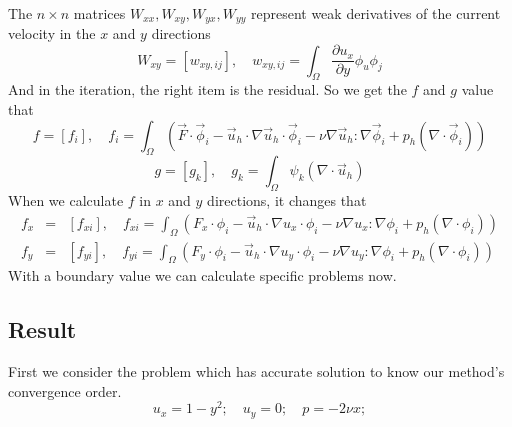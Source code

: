 \documentclass[a4paper]{article}
\begin{document}
The $n\times n$ matrices $W_{xx}, W_{xy}, W_{yx}, W_{yy}$ represent weak derivatives of the current velocity in the $x$ and $y$ directions
\begin{equation}
W_{xy} = [w_{xy,ij}],\quad w_{xy,ij} = \int_{\Omega} \frac{\partial u_x}{\partial y}\phi_u \phi_j
\label{mt::W}
\end{equation}
And in the iteration, the right item is the residual. So we get the $f$ and $g$ value that
\begin{equation}
f = [f_i],\quad f_i=\int_{\Omega}(\vec{F}\cdot\vec{\phi}_i-\vec{u}_h\cdot\nabla\vec{u}_h\cdot\vec{\phi}_i-\nu\nabla\vec{u}_h:\nabla\vec{\phi}_i+p_h(\nabla\cdot\vec{\phi}_i))
\end{equation}
\begin{equation}
g = [g_k],\quad g_k=\int_{\Omega}\psi_k(\nabla \cdot \vec{u}_h)
\end{equation}
When we calculate $f$ in $x$ and $y$ directions, it changes that
\begin{equation}
\begin{array}{rcl}
f_x &=& [f_{xi}],\quad f_{xi}=\int_{\Omega}(F_x\cdot\phi_i-\vec{u}_h\cdot\nabla u_x\cdot\phi_i-\nu\nabla u_x:\nabla\phi_i+p_h(\nabla\cdot\phi_i)) \\
f_y &=& [f_{yi}],\quad f_{yi}=\int_{\Omega}(F_y\cdot\phi_i-\vec{u}_h\cdot\nabla u_y\cdot\phi_i-\nu\nabla u_y:\nabla\phi_i+p_h(\nabla\cdot\phi_i))
\label{mt::f}
\end{array}
\end{equation}
With a boundary value we can calculate specific problems now.
\newpage
\subsection{Result}
First we consider the problem which has accurate solution to know our method's convergence order.
\begin{equation}
u_x = 1-y^2;\quad u_y = 0;\quad p=-2\nu x;
\label{pr::accurate}
\end{equation}
\end{document}
